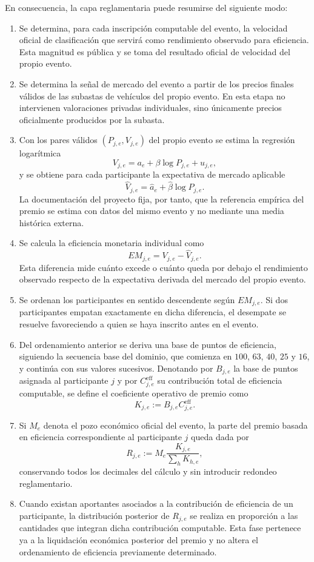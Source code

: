 \documentclass[11pt,a4paper]{article}
\theoremstyle{definition}
\begin{document}
En consecuencia, la capa reglamentaria puede resumirse del siguiente modo:
\begin{enumerate}
    \item Se determina, para cada inscripción computable del evento, la velocidad oficial de clasificación que servirá como rendimiento observado para eficiencia. Esta magnitud es pública y se toma del resultado oficial de velocidad del propio evento.
    \item Se determina la señal de mercado del evento a partir de los precios finales válidos de las subastas de vehículos del propio evento. En esta etapa no intervienen valoraciones privadas individuales, sino únicamente precios oficialmente producidos por la subasta.
    \item Con los pares válidos $(P_{j,e},V_{j,e})$ del propio evento se estima la regresión logarítmica
    \[
    V_{j,e}=a_e+\beta\log P_{j,e}+u_{j,e},
    \]
    y se obtiene para cada participante la expectativa de mercado aplicable
    \[
    \widehat V_{j,e}=\widehat a_e+\widehat\beta\log P_{j,e}.
    \]
    La documentación del proyecto fija, por tanto, que la referencia empírica del premio se estima con datos del mismo evento y no mediante una media histórica externa.
    \item Se calcula la eficiencia monetaria individual como
    \[
    EM_{j,e}=V_{j,e}-\widehat V_{j,e}.
    \]
    Esta diferencia mide cuánto excede o cuánto queda por debajo el rendimiento observado respecto de la expectativa derivada del mercado del propio evento.
    \item Se ordenan los participantes en sentido descendente según $EM_{j,e}$. Si dos participantes empatan exactamente en dicha diferencia, el desempate se resuelve favoreciendo a quien se haya inscrito antes en el evento.
    \item Del ordenamiento anterior se deriva una base de puntos de eficiencia, siguiendo la secuencia base del dominio, que comienza en $100$, $63$, $40$, $25$ y $16$, y continúa con sus valores sucesivos. Denotando por $B_{j,e}$ la base de puntos asignada al participante $j$ y por $C^{\mathrm{eff}}_{j,e}$ su contribución total de eficiencia computable, se define el coeficiente operativo de premio como
    \[
    K_{j,e}:=B_{j,e}C^{\mathrm{eff}}_{j,e}.
    \]
    \item Si $M_e$ denota el pozo económico oficial del evento, la parte del premio basada en eficiencia correspondiente al participante $j$ queda dada por
    \[
    R_{j,e}:=M_e\frac{K_{j,e}}{\sum_h K_{h,e}},
    \]
    conservando todos los decimales del cálculo y sin introducir redondeo reglamentario.
    \item Cuando existan aportantes asociados a la contribución de eficiencia de un participante, la distribución posterior de $R_{j,e}$ se realiza en proporción a las cantidades que integran dicha contribución computable. Esta fase pertenece ya a la liquidación económica posterior del premio y no altera el ordenamiento de eficiencia previamente determinado.
\end{enumerate}
\end{document}
